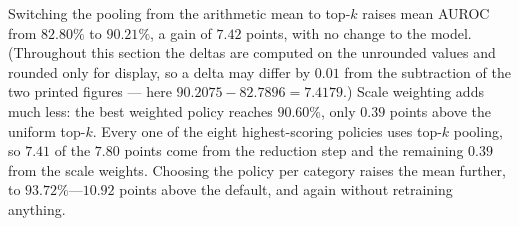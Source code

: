 \begin{table}[t]
\centering
\caption{Scoring policies evaluated on one frozen detector per category
(15 categories, 82 policies). ``Worst category'' is the lowest per-category
AUROC, i.e.\ the failure mode that matters in deployment. The default is the
policy the published pipeline uses. Two rows \emph{read the test labels} --- the
best single policy, picked per category on test, and the per-category oracle ---
and both are upper bounds rather than achievable results; the remaining rows are
label-free.}
\label{tab:fusion}

\end{table}

Switching the pooling from the arithmetic mean to top-$k$ raises mean AUROC from
$82.80\%$ to $90.21\%$, a gain of $7.42$ points, with no change to the model.
(Throughout this section the deltas are computed on the unrounded values and
rounded only for display, so a delta may differ by $0.01$ from the subtraction of
the two printed figures --- here $90.2075 - 82.7896 = 7.4179$.)
Scale weighting adds much less: the best weighted policy reaches $90.60\%$, only
$0.39$ points above the uniform top-$k$. Every one of the eight highest-scoring
policies uses top-$k$ pooling, so $7.41$ of the $7.80$ points come from the
reduction step and the remaining $0.39$ from the scale weights. Choosing the policy
per category raises the mean further, to $93.72\%$---$10.92$ points above the
default, and again without retraining anything.

